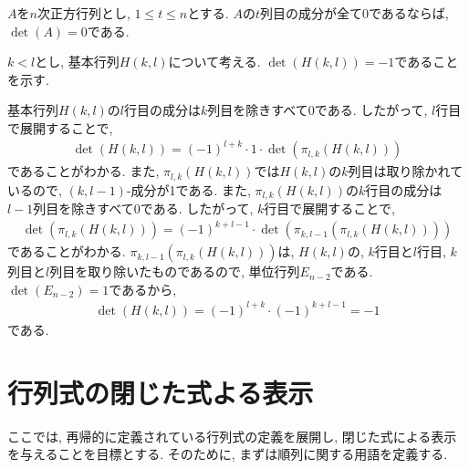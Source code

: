 \begin{prop}
  $A$を$n$次正方行列とし,
  $1\leq t \leq n$とする.
  $A$の$t$列目の成分が全て$0$であるならば,
  $\det(A)=0$である.
\end{prop}

\begin{example}
  $k<l$とし,
  基本行列$H(k,l)$について考える.
  $\det(H(k,l))=-1$であることを示す.
  
  基本行列$H(k,l)$の$l$行目の成分は$k$列目を除きすべて0である.
  したがって, $l$行目で展開することで,
  \begin{align*}
    \det(H(k,l))=(-1)^{l+k}\cdot 1 \cdot \det(\pi_{l,k}(H(k,l)))
  \end{align*}
  であることがわかる.
  また,
  $\pi_{l,k}(H(k,l))$では$H(k,l)$の$k$列目は取り除かれているので,
  $(k,l-1)$-成分が1である.
  また,
  $\pi_{l,k}(H(k,l))$の$k$行目の成分は$l-1$列目を除きすべて0である.
  したがって, $k$行目で展開することで,
  \begin{align*}
    \det(\pi_{l,k}(H(k,l)))=(-1)^{k+l-1}\cdot \det(\pi_{k,l-1}(\pi_{l,k}(H(k,l))))
  \end{align*}
  であることがわかる.
  $\pi_{k,l-1}(\pi_{l,k}(H(k,l)))$は,
  $H(k,l)$の, $k$行目と$l$行目, $k$列目と$l$列目を取り除いたものであるので,
  単位行列$E_{n-2}$である.
  $\det(E_{n-2})=1$であるから,
  \begin{align*}
    \det(H(k,l))=(-1)^{l+k}\cdot (-1)^{k+l-1}=-1
  \end{align*}
  である.
\end{example}


\section{行列式の閉じた式よる表示}

ここでは, 再帰的に定義されている行列式の定義を展開し,
閉じた式による表示を与えることを目標とする.
そのために, まずは順列に関する用語を定義する.

